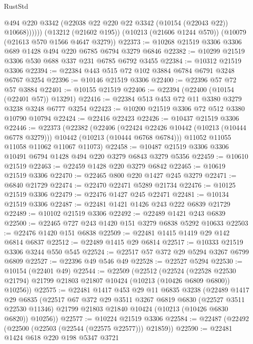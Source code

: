 \begin{lexlean}{RustStd}
\begin{coremodule}
{\begin{coremodule}
{{{{{{{{{{{{{{{{{{{{{{{{{{              @494
              @220
              @3342
              (@22038 @22 @220 @22 @3342 (@10154 (@22043 @22)) @10668))))))
    (@13212 (@21602 @195))
    (@10213 (@21606 @1244 @570))
    (@10079 (@21613 @570 @1566 @4647 @3279))
@22373 := @10268 @21519 @3306 @3306 @689 @1428 @494 @220 @6785 @6794 @3279 @6846
@22382 := @10299 @21519 @3306 @530 @688 @337 @231 @6785 @6792 @3455
@22384 := @10312 @21519 @3306
@22394 := @22384 @443 @515 @72 @102 @3884 @6784 @6791 @3248 @6767 @3254
@22396 := @10146 @21519 @3306
@22400 := @22396 @57 @72 @57 @3884
@22401 := @10155 @21519
@22406 := @22394 (@22400 (@10154 (@22401 @57)) @13291)
@22416 := @22384 @513 @453 @72 @11 @3380 @3279 @3238 @3248 @6777 @3254
@22423 := @10200 @21519 @3306 @72 @512 @3380 @10790 @10794
@22424 := @22416 @22423
@22426 := @10437 @21519 @3306
@22446 := @22373
    (@22382
      (@22406
        (@22424 @22426 @10442 (@10213 (@10444 @6778 @3279)))
        @10442
        (@10213 (@10444 @6768 @6784)))
      @11052
      @11055
      @11058
      @11062
      @11067
      @11073)
@22458 := @10487 @21519 @3306 @3306 @10491 @6794 @1428 @494 @220 @3279 @6843 @3279 @5356
@22459 := @10610 @21519
@22463 := @22459 @1428 @220 @3279 @6842
@22465 := @10619 @21519 @3306
@22470 := @22465 @800 @220 @1427 @245 @3279
@22471 := @6840 @21729
@22474 := @22470 @22471 @5289 @21734
@22476 := @10125 @21519 @3306
@22479 := @22476 @1427 @245 @22471
@22481 := @10134 @21519 @3306
@22487 := @22481 @1421 @1426 @243 @222 @6839 @21729
@22489 := @10102 @21519 @3306
@22492 := @22489 @1421 @243 @6839
@22500 := @22465 @727 @243 @1420 @151 @3279 @6838 @5292 @10633
@22503 := @22476 @1420 @151 @6838
@22509 := @22481 @1415 @1419 @29 @142 @6814 @6837
@22512 := @22489 @1415 @29 @6814
@22517 := @10333 @21519 @3306 @3244 @550 @545
@22524 := @22517 @57 @372 @29 @5294 @3267 @6799 @6809
@22527 := @22396 @49 @546 @49
@22528 := @22527 @5294
@22530 := @10154 (@22401 @49)
@22544 := @22509
    (@22512
      (@22524
        (@22528 @22530 @21794)
        @21799
        @21803
        @21807
        @10424
        (@10213 (@10426 @6809 @6800))
        @10256))
@22575 := @22481
    @1417
    @453
    @29
    @11
    @6835
    @3238
    (@22489
      @1417
      @29
      @6835
      (@22517
        @67
        @372
        @29
        @3511
        @3267
        @6819
        @6830
        (@22527 @3511 @22530 @11346)
        @21799
        @21803
        @21840
        @10424
        (@10213 (@10426 @6830 @6820))
        @10256))
@22577 := @10224 @21519 @3306
@22584 := @22487 (@22492 (@22500 (@22503 (@22544 (@22575 @22577))) @21859))
@22590 := @22481 @1424 @618 @220 @198 @5347 @3721
}}}}}}}}}}}}}}}}}}}}}}}}}}
\end{coremodule}}
\end{coremodule}
\end{lexlean}
